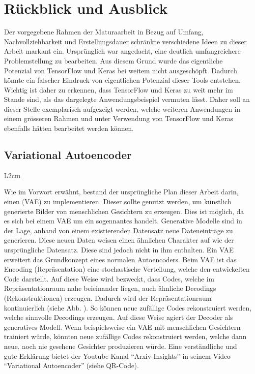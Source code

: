 \chapter*{Rückblick und Ausblick}

Der vorgegebene Rahmen der Maturaarbeit in Bezug auf Umfang,
Nachvollziehbarkeit und Erstellungsdauer schränkte verschiedene Ideen zu dieser
Arbeit markant ein. Ursprünglich war angedacht, eine deutlich umfangreichere
Problemstellung zu bearbeiten. Aus diesem Grund wurde das eigentliche Potenzial von
TensorFlow und Keras bei weitem nicht ausgeschöpft. Dadurch könnte ein falscher
Eindruck von eigentlichen Potenzial dieser Tools entstehen. Wichtig ist daher zu
erkennen, dass TensorFlow und Keras zu weit mehr im Stande sind, als das
dargelegte Anwendungsbeispiel vermuten lässt.
\para{}
Daher soll an dieser Stelle exemplarisch aufgezeigt werden, welche
weiteren Anwendungen in einem grösseren Rahmen und unter Verwendung von
TensorFlow und Keras ebenfalls hätten bearbeitet werden können.

\section*{Variational Autoencoder}
\begin{wrapfigure}{L}{2cm}
\end{wrapfigure}
Wie im Vorwort erwähnt, bestand der ursprüngliche Plan dieser Arbeit
darin, einen  (VAE) zu implementieren. Dieser sollte genutzt werden,
um künstlich generierte Bilder von menschlichen Gesichtern zu erzeugen.
Dies ist möglich, da es sich bei einem VAE um ein sogennantes
 handelt.
\para{}
Generative Modelle sind in der Lage, anhand
von einem existierenden Datensatz neue Dateneinträge zu generieren. Diese neuen Daten
weisen einen ähnlichen Charakter auf wie der ursprüngliche Datensatz. Diese sind
jedoch nicht in ihm enthalten.
\para{}
Ein VAE erweitert das Grundkonzept eines normalen Autoencoders. Beim VAE ist das
Encoding (Repräsentation) eine stochastische Verteilung, welche den entwickelten
Code darstellt.
Auf diese Weise wird bezweckt, dass Codes, welche im Repräsentationraum nahe beieinander liegen, auch ähnliche
Decodings (Rekonstruktionen) erzeugen. Dadurch wird der Repräsentationraum
kontinuierlich (siehe Abb. ). So können neue zufällige Codes
rekonstruiert werden, welche sinnvolle Decodings erzeugen. Auf diese Weise agiert der Decoder als generatives
Modell. Wenn beispielsweise ein VAE mit menschlichen Gesichtern
trainiert würde, könnten neue zufällige Codes rekonstruiert werden, welche dann
neue, noch nie gesehene Gesichter produzieren würde.
\para{}
Eine verständliche und gute Erklärung bietet der Youtube-Kanal
``Arxiv-Insights'' in seinem Video ``Variational Autoencoder'' (siehe QR-Code).

